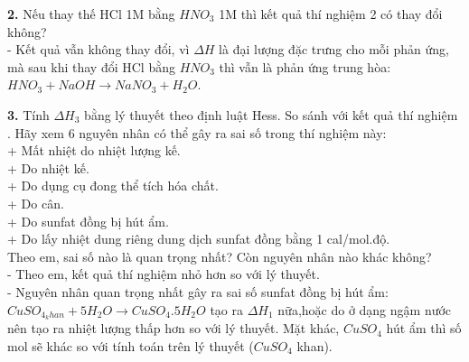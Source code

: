    \textbf{2.} Nếu thay thế HCl 1M bằng $HNO_{3}$ 1M thì kết quả thí nghiệm 2 có thay đổi không?\\
   
   - Kết quả vẫn không thay đổi, vì $\Delta H$ là đại lượng đặc trưng cho mỗi phản ứng, mà sau khi thay đổi HCl bằng $HNO_{3}$ thì vẫn là phản ứng trung hòa: $HNO_{3} + NaOH \to NaNO_{3} + H_{2}O$. \\
  
  \newpage
  
  \textbf{3.} Tính $\Delta H_{3}$ bằng lý thuyết theo định luật Hess. So sánh với kết quả thí nghiệm . Hãy xem 6 nguyên nhân có thể gây ra sai số trong thí nghiệm này:\\
   + Mất nhiệt do nhiệt lượng kế.\\
   + Do nhiệt kế.\\
   + Do dụng cụ đong thể tích hóa chất.\\
   + Do cân.\\
   + Do sunfat đồng bị hút ẩm.\\
   + Do lấy nhiệt dung riêng dung dịch sunfat đồng bằng 1 cal/mol.độ.\\
   Theo em, sai số nào là quan trọng nhất? Còn nguyên nhân nào khác không?\\
   
   \noindent - Theo em, kết quả thí nghiệm nhỏ hơn so với lý thuyết.\\
   - Nguyên nhân quan trọng nhất gây ra sai số sunfat đồng bị hút ẩm:\\ $CuSO_{4_khan} + 5H_{2}O \to CuSO_{4}.5H_{2}O$ tạo ra $\Delta H_{1}$ nữa,hoặc do ở dạng ngậm nước nên tạo ra nhiệt lượng thấp hơn so với lý thuyết. Mặt khác, $CuSO_{4}$ hút ẩm thì số mol sẽ khác so với tính toán trên lý thuyết ($CuSO_{4}$ khan). 